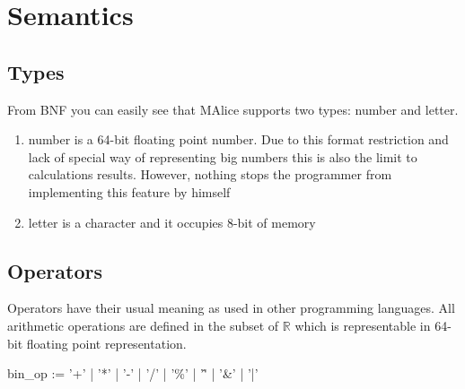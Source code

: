\documentclass[a4wide, 11pt]{article}
\begin{document}
\section{Semantics}

\subsection{Types}

From BNF you can easily see that MAlice supports two types: number and letter.

\begin{enumerate}
     \item
     number is a 64-bit floating point number. Due to this format restriction and lack of special way of representing big numbers this is also the limit to calculations results. However, nothing stops the programmer from implementing this feature by himself

     \item
     letter is a character and it occupies 8-bit of memory

\end{enumerate}

\subsection{Operators}

Operators have their usual meaning as used in other programming languages. All arithmetic operations are defined in the subset of $\mathbb{R}$ which is representable in 64-bit floating point representation.

bin_op      := '+' | '*'  | '-' | '/' | '\%' | '\^' | '\&' | '|'
\end{document}
